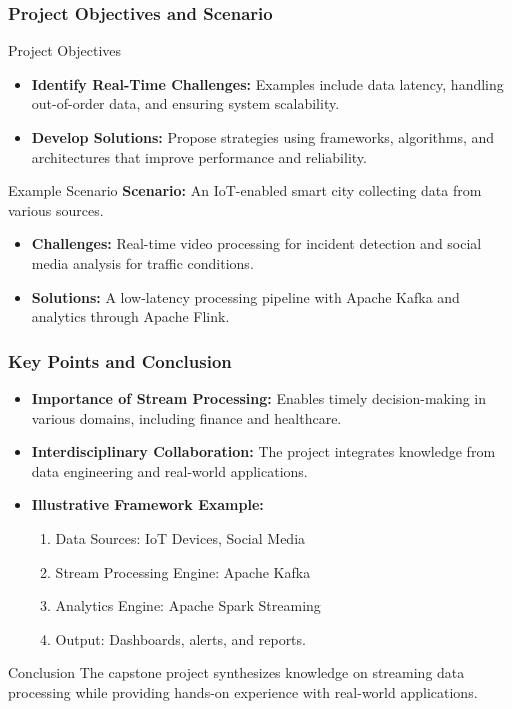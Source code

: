 \documentclass[aspectratio=169]{beamer}
\begin{document}
\begin{frame}[fragile]
    \frametitle{Project Objectives and Scenario}
    \begin{block}{Project Objectives}
        \begin{itemize}
            \item \textbf{Identify Real-Time Challenges:} 
            Examples include data latency, handling out-of-order data, and ensuring system scalability.
            
            \item \textbf{Develop Solutions:} 
            Propose strategies using frameworks, algorithms, and architectures that improve performance and reliability.
        \end{itemize}
    \end{block}
    
    \begin{block}{Example Scenario}
        \textbf{Scenario:} An IoT-enabled smart city collecting data from various sources.
        \begin{itemize}
            \item \textbf{Challenges:} Real-time video processing for incident detection and social media analysis for traffic conditions.
            \item \textbf{Solutions:} A low-latency processing pipeline with Apache Kafka and analytics through Apache Flink.
        \end{itemize}
    \end{block}
\end{frame}

\begin{frame}[fragile]
    \frametitle{Key Points and Conclusion}
    \begin{itemize}
        \item \textbf{Importance of Stream Processing:} 
        Enables timely decision-making in various domains, including finance and healthcare.

        \item \textbf{Interdisciplinary Collaboration:} 
        The project integrates knowledge from data engineering and real-world applications.
        
        \item \textbf{Illustrative Framework Example:}
        \begin{enumerate}
            \item Data Sources: IoT Devices, Social Media
            \item Stream Processing Engine: Apache Kafka
            \item Analytics Engine: Apache Spark Streaming
            \item Output: Dashboards, alerts, and reports.
        \end{enumerate}
    \end{itemize}
    
    \begin{block}{Conclusion}
        The capstone project synthesizes knowledge on streaming data processing while providing hands-on experience with real-world applications.
    \end{block}
\end{frame}
\end{document}
